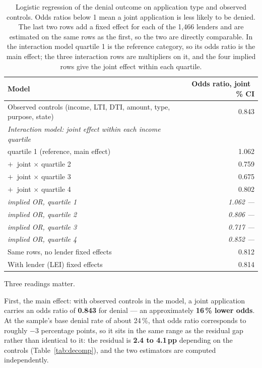 \documentclass[sigconf,balance=false]{acmart}
\begin{document}
\begin{table}[t]
\caption{Logistic regression of the denial outcome on application type and
         observed controls. Odds ratios below 1 mean a joint application is
         less likely to be denied. The last two rows add a fixed effect for
         each of the 1{,}466 lenders and are estimated on the same rows as
         the first, so the two are directly comparable. In the interaction
         model quartile 1 is the reference category, so its odds ratio is
         the main effect; the three interaction rows are multipliers on it,
         and the four implied rows give the joint effect within each
         quartile.}
\label{tab:logit}
\centering
\footnotesize
\begin{tabular}{@{}p{}r@{}}
\toprule
Model & Odds ratio, joint \quad 95\,\% CI \\
\midrule
Observed controls (income, LTI, DTI, amount, type, purpose, state) & 0.843 \quad [0.837, 0.848] \\
\midrule
\emph{Interaction model: joint effect within each income quartile} & \\
\quad quartile 1 (reference, main effect) & 1.062 \quad [1.049, 1.075] \\
\quad $+~$ joint $\times$ quartile 2 & 0.759 \quad [0.748, 0.771] \\
\quad $+~$ joint $\times$ quartile 3 & 0.675 \quad [0.664, 0.685] \\
\quad $+~$ joint $\times$ quartile 4 & 0.802 \quad [0.789, 0.816] \\
\quad \emph{implied OR, quartile 1} & \emph{1.062} \quad \emph{---} \\
\quad \emph{implied OR, quartile 2} & \emph{0.806} \quad \emph{---} \\
\quad \emph{implied OR, quartile 3} & \emph{0.717} \quad \emph{---} \\
\quad \emph{implied OR, quartile 4} & \emph{0.852} \quad \emph{---} \\
\midrule
Same rows, no lender fixed effects & 0.812 \quad [0.801, 0.823] \\
With lender (LEI) fixed effects & 0.814 \quad [0.803, 0.826] \\
\bottomrule
\end{tabular}
\end{table}

Three readings matter.

First, the main effect: with observed controls in the model, a joint
application carries an odds ratio of \textbf{0.843} for denial --- an
approximately \textbf{16\,\% lower odds}. At the sample's base denial
rate of about 24\,\%, that odds ratio corresponds to roughly $-3$
percentage points, so it sits in the same range as the residual gap rather
than identical to it: the residual is \textbf{2.4 to 4.1\,pp} depending on
the controls (Table~\ref{tab:decomp}), and the two estimators are computed
independently.
\end{document}
